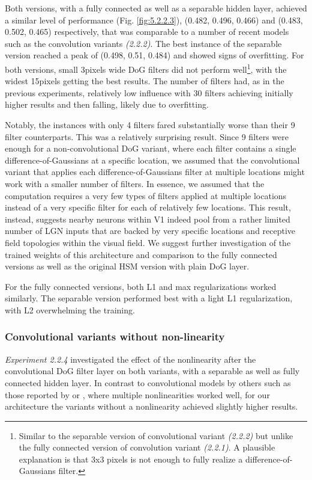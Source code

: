 Both versions, with a fully connected as well as a separable hidden layer, achieved a similar level of performance (Fig. \ref{fig:5.2.2.3}), (0.482, 0.496, 0.466) and (0.483, 0.502, 0.465) respectively, that was comparable to a number of recent models such as the convolution variants \textit{(2.2.2)}. The best instance of the separable version reached a peak of (0.498, 0.51, 0.484) and showed signs of overfitting. For both versions, small 3pixels wide DoG filters did not perform well\footnote{Similar to the separable version of convolutional variant \textit{(2.2.2)} but unlike the fully connected version of convolution variant \textit{(2.2.1)}. A plausible explanation is that 3x3 pixels is not enough to fully realize a difference-of-Gaussians filter.}, with the widest 15pixels getting the best results. The number of filters had, as in the previous experiments, relatively low influence with 30 filters achieving initially higher results and then falling, likely due to overfitting.

Notably, the instances with only 4 filters fared substantially worse than their 9 filter counterparts. This was a relatively surprising result. Since 9 filters were enough for a non-convolutional DoG variant, where each filter contains a single difference-of-Gaussians at a specific location, we assumed that the convolutional variant that applies each difference-of-Gaussians filter at multiple locations might work with a smaller number of filters. In essence, we assumed that the computation requires a very few types of filters applied at multiple locations instead of a very specific filter for each of relatively few locations. This result, instead, suggests nearby neurons within V1 indeed pool from a rather limited number of LGN inputs that are backed by very specific locations and receptive field topologies within the visual field. We suggest further investigation of the trained weights of this architecture and comparison to the fully connected versions as well as the original HSM version with plain DoG layer.

For the fully connected versions, both L1 and max regularizations worked similarly. The separable version performed best with a light L1 regularization, with L2 overwhelming the training.

\subsubsection{Convolutional variants without non-linearity}

\textit{Experiment 2.2.4} investigated the effect of the nonlinearity after the convolutional DoG filter layer on both variants, with a separable as well as fully connected hidden layer. In contrast to convolutional models by others such as those reported by \cite{klindt} or \cite{ecker}, where multiple nonlinearities worked well, for our architecture the variants without a nonlinearity achieved slightly higher results.

